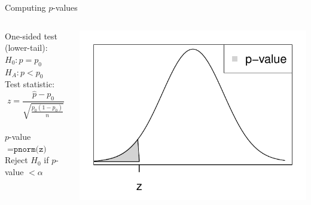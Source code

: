 \documentclass[fleqn, 11pt]{beamer}
\begin{document}
\begin{frame}{Computing $p$-values}
\begin{columns}
\begin{column}{0.45\textwidth}
One-sided test (lower-tail):\\
$H_0: p = p_0$\\
$H_A: p < p_0$\\
\vspace{10pt}
Test statistic:\\
\[ z = \frac{\hat{p} - p_0}{\sqrt{\frac{p_0(1-p_0)}{n}}} \]\\
\vspace{10pt}
$p$-value $= \texttt{pnorm(z)}$\\ 
\vspace{10pt}
Reject $H_0$ if $p$-value $< \alpha$\\
\end{column}
\begin{column}{0.5\textwidth}
\includegraphics[scale=0.5]{figure/pvalue_lower.pdf}
\end{column}
\end{columns}
\end{frame}
\end{document}
